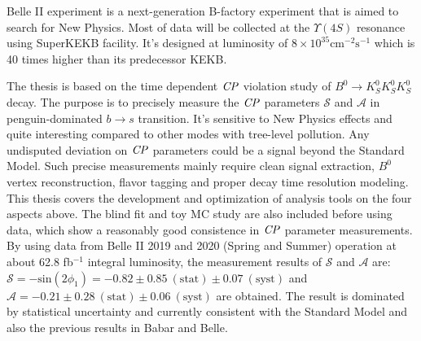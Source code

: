 % 
% 
%
Belle II experiment is a next-generation B-factory experiment that is aimed to search for New Physics. Most of data will be collected at the $\Upsilon(4S)$ resonance using SuperKEKB facility. It's designed at luminosity of $8 \times 10^{35} \text{cm}^{-2}\text{s}^{-1}$ which is 40 times higher than its predecessor KEKB.

The thesis is based on the time dependent $\it{CP}$ violation study of $B^0 \to K_S^0 K_S^0 K_S^0$ decay. The purpose is to precisely measure the $\it{CP}$ parameters $\mathcal{S}$ and $\mathcal{A}$ in penguin-dominated $b \to s$ transition. It's sensitive to New Physics effects and quite interesting compared to other modes with tree-level pollution. Any undisputed deviation on $\it{CP}$ parameters could be a signal beyond the Standard Model. Such precise measurements mainly require clean signal extraction, $B^0$ vertex reconstruction, flavor tagging and proper decay time resolution modeling. This thesis covers the development and optimization of analysis tools on the four aspects above. The blind fit and toy MC study are also included before using data, which show a reasonably good consistence in $\it{CP}$ parameter measurements. By using data from Belle II 2019 and 2020 (Spring and Summer) operation at about 62.8 fb$^{-1}$ integral luminosity, the measurement results of $\mathcal{S}$ and $\mathcal{A}$ are: $\mathcal{S}= - \text{sin}(2\phi_1) = -0.82 \pm 0.85 \: (\text{stat}) \pm 0.07 \: (\text{syst})$ and $\mathcal{A}= -0.21 \pm 0.28 \: (\text{stat}) \pm 0.06 \: (\text{syst})$ are obtained. The result is dominated by statistical uncertainty and currently consistent with the Standard Model and also the previous results in Babar and Belle. 




 

